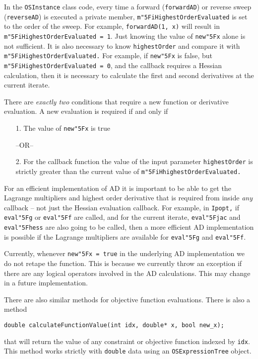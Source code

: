 \documentclass[11pt]{article}
\renewcommand{\_}{{\char"5F}}
\renewcommand{\{}{{\char"7B}}
\renewcommand{\}}{{\char"7D}}
\renewcommand{\^}{{\char"0D}}
\renewcommand{\'}{{\char"0D}}
\begin{document}
In the {\tt OSInstance} class code,  every time a forward ({\tt forwardAD}) or reverse sweep ({\tt reverseAD}) is executed a private  member, {\tt m\_iHighestOrderEvaluated}  is  set to the order of the sweep. For example, {\tt forwardAD(1, x)} will result in {\tt  m\_iHighestOrderEvaluated = 1}.  Just knowing the value  of  {\tt new\_x} alone is not sufficient. It is also necessary  to know {\tt highestOrder} and compare it with {\tt m\_iHighestOrderEvaluated.}  For example, if  {\tt new\_x}  is  false,  but {\tt m\_iHighestOrderEvaluated = 0},  and   the callback requires a Hessian calculation, then it is necessary to calculate the first and second derivatives at the current iterate.

There are {\it  exactly two} conditions that  require a new function or derivative evaluation.   A new evaluation is required if and only if

\begin{itemize}
\item[1.]   The value of {\tt new\_x} is  true

\begin{center}
 --OR--
\end{center}


\item[2.] For the callback function the value of the input parameter {\tt highestOrder} is strictly greater than the current value  of    {\tt m\_iHhighestOrderEvaluated.}
\end{itemize}

For an efficient implementation of AD it is important to be able to get the Lagrange multipliers and highest order derivative that is required from inside {\it any} callback -- not just the Hessian evaluation callback. For example, in {\tt Ipopt,} if  {\tt eval\_g}  or {\tt eval\_f} are called, and  for the current iterate, {\tt eval\_jac} and {\tt eval\_hess} are also going to be called, then  a more efficient AD implementation is possible if the Lagrange multipliers are available for {\tt eval\_g} and {\tt eval\_f}.

Currently, whenever {\tt new\_x = true} in the underlying AD implementation we do not retape the function. This is because we currently throw an exception if there are any logical operators involved in the AD calculations. This may change in a future implementation.


There are also similar methods for objective function evaluations.  There is also a method
\begin{verbatim}
double calculateFunctionValue(int idx, double* x, bool new_x);
\end{verbatim}
that will return the value of any constraint or objective function indexed by {\tt idx}. This method works strictly with {\tt double} data using an {\tt OSExpressionTree} object.
\end{document}
